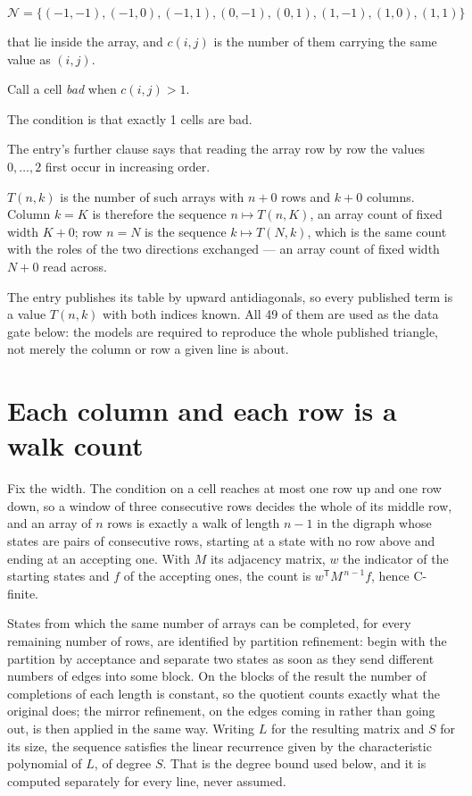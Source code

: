 \documentclass[11pt]{article}
\theoremstyle{definition}
\begin{document}
\[\mathcal{N} = \{(-1,-1), (-1,0), (-1,1), (0,-1), (0,1), (1,-1), (1,0), (1,1)\}\]

that lie inside the array, and $c(i,j)$ is the number of them carrying the same value as $(i,j)$.

Call a cell {\itshape bad} when $c(i,j) > 1$.

The condition is that exactly 1 cells are bad.

The entry's further clause says that reading the array row by row the values $0,\dots,2$ first occur in increasing order.

$T(n,k)$ is the number of such arrays with $n + 0$ rows and $k + 0$ columns. Column $k = K$ is therefore the sequence $n \mapsto T(n,K)$, an array count of fixed width $K + 0$; row $n = N$ is the sequence $k \mapsto T(N,k)$, which is the same count with the roles of the two directions exchanged --- an array count of fixed width $N + 0$ read across.

The entry publishes its table by upward antidiagonals, so every published term is a value $T(n,k)$ with both indices known. All 49 of them are used as the data gate below: the models are required to reproduce the whole published triangle, not merely the column or row a given line is about.

\section{Each column and each row is a walk count}

Fix the width. The condition on a cell reaches at most one row up and one row down, so a window of three consecutive rows decides the whole of its middle row, and an array of $n$ rows is exactly a walk of length $n-1$ in the digraph whose states are pairs of consecutive rows, starting at a state with no row above and ending at an accepting one. With $M$ its adjacency matrix, $w$ the indicator of the starting states and $f$ of the accepting ones, the count is $w^{\mathsf T}M^{\,n-1}f$, hence C-finite.

States from which the same number of arrays can be completed, for every remaining number of rows, are identified by partition refinement: begin with the partition by acceptance and separate two states as soon as they send different numbers of edges into some block. On the blocks of the result the number of completions of each length is constant, so the quotient counts exactly what the original does; the mirror refinement, on the edges coming in rather than going out, is then applied in the same way. Writing $L$ for the resulting matrix and $S$ for its size, the sequence satisfies the linear recurrence given by the characteristic polynomial of $L$, of degree $S$. That is the degree bound used below, and it is computed separately for every line, never assumed.
\end{document}
